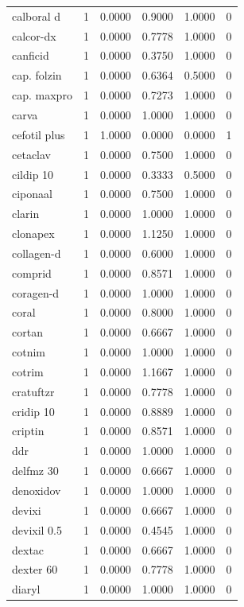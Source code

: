 \begin{longtable}{p{3.0cm}rrrrr}
calboral d & 1 & 0.0000 & 0.9000 & 1.0000 & 0 \\
calcor-dx & 1 & 0.0000 & 0.7778 & 1.0000 & 0 \\
canficid & 1 & 0.0000 & 0.3750 & 1.0000 & 0 \\
cap. folzin & 1 & 0.0000 & 0.6364 & 0.5000 & 0 \\
cap. maxpro & 1 & 0.0000 & 0.7273 & 1.0000 & 0 \\
carva & 1 & 0.0000 & 1.0000 & 1.0000 & 0 \\
cefotil plus & 1 & 1.0000 & 0.0000 & 0.0000 & 1 \\
cetaclav & 1 & 0.0000 & 0.7500 & 1.0000 & 0 \\
cildip 10 & 1 & 0.0000 & 0.3333 & 0.5000 & 0 \\
ciponaal & 1 & 0.0000 & 0.7500 & 1.0000 & 0 \\
clarin & 1 & 0.0000 & 1.0000 & 1.0000 & 0 \\
clonapex & 1 & 0.0000 & 1.1250 & 1.0000 & 0 \\
collagen-d & 1 & 0.0000 & 0.6000 & 1.0000 & 0 \\
comprid & 1 & 0.0000 & 0.8571 & 1.0000 & 0 \\
coragen-d & 1 & 0.0000 & 1.0000 & 1.0000 & 0 \\
coral & 1 & 0.0000 & 0.8000 & 1.0000 & 0 \\
cortan & 1 & 0.0000 & 0.6667 & 1.0000 & 0 \\
cotnim & 1 & 0.0000 & 1.0000 & 1.0000 & 0 \\
cotrim & 1 & 0.0000 & 1.1667 & 1.0000 & 0 \\
cratuftzr & 1 & 0.0000 & 0.7778 & 1.0000 & 0 \\
cridip 10 & 1 & 0.0000 & 0.8889 & 1.0000 & 0 \\
criptin & 1 & 0.0000 & 0.8571 & 1.0000 & 0 \\
ddr & 1 & 0.0000 & 1.0000 & 1.0000 & 0 \\
delfmz 30 & 1 & 0.0000 & 0.6667 & 1.0000 & 0 \\
denoxidov & 1 & 0.0000 & 1.0000 & 1.0000 & 0 \\
devixi & 1 & 0.0000 & 0.6667 & 1.0000 & 0 \\
devixil 0.5 & 1 & 0.0000 & 0.4545 & 1.0000 & 0 \\
dextac & 1 & 0.0000 & 0.6667 & 1.0000 & 0 \\
dexter 60 & 1 & 0.0000 & 0.7778 & 1.0000 & 0 \\
diaryl & 1 & 0.0000 & 1.0000 & 1.0000 & 0 \\

\end{longtable}
